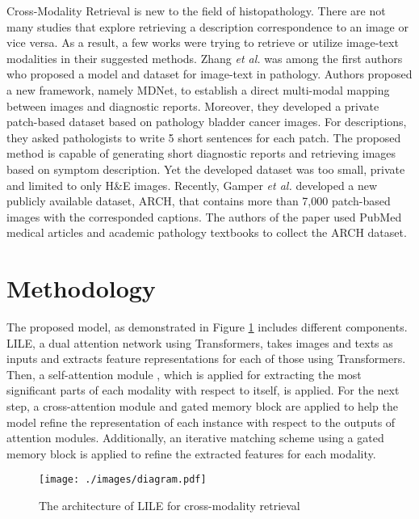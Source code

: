 \documentclass{midl}
\begin{document}
Cross-Modality Retrieval is new to the field of histopathology. There are not many studies that explore retrieving a description correspondence to an image or vice versa. As a result, a few works were trying to retrieve or utilize image-text modalities in their suggested methods. 
Zhang \textit{et al.} \cite{zhang2017mdnet} was among the first authors who proposed a model and dataset for image-text in pathology. Authors proposed a new framework, namely MDNet, to establish a direct multi-modal mapping between images and diagnostic reports. Moreover, they developed a private patch-based dataset based on pathology bladder cancer images. For descriptions, they asked pathologists to write 5 short sentences for each patch. The proposed method is capable of generating short diagnostic reports and retrieving images based on symptom description. Yet the developed dataset was too small, private and limited to only H\&E images. Recently, Gamper \textit{et al.} \cite{gamper2021multiple} developed a new publicly available dataset, ARCH, that contains more than 7,000 patch-based images with the corresponded captions. The authors of the paper used PubMed medical articles \cite{PubMed60:online} and academic pathology textbooks to collect the ARCH dataset.
\section{Methodology}


The proposed model, as demonstrated in Figure \ref{architecutre} includes different components. LILE, a dual attention network using Transformers,  takes images and texts as inputs and extracts feature representations for each of those using Transformers. Then, a self-attention module \cite{vaswani2017attention},  which is applied for extracting the most significant parts of each modality with respect to itself, is applied. For the next step, a cross-attention module and gated memory block are applied to help the model refine the representation of each instance with respect to the outputs of attention modules. Additionally, an iterative matching scheme using a gated memory block is applied to refine the extracted features for each modality.


\begin{figure}[ht!]
    \centering
    \texttt{[image: ./images/diagram.pdf]}
    \caption{The architecture of LILE for cross-modality retrieval }
    \label{architecutre}
\end{figure}
\end{document}
